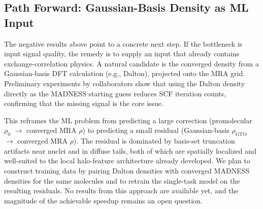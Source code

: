 \subsection{Path Forward: Gaussian-Basis Density as ML Input}
\label{sec:path_forward}

The negative results above point to a concrete next step. If the
bottleneck is input signal quality, the remedy is to supply an input
that already contains exchange-correlation physics. A natural candidate
is the converged density from a Gaussian-basis DFT calculation (e.g.,
Dalton), projected onto the MRA grid. Preliminary experiments by
collaborators show that using the Dalton density directly as the
MADNESS starting guess reduces SCF iteration counts, confirming that
the missing signal is the core issue.

This reframes the ML problem from predicting a large correction
(promolecular $\rho_0$ $\to$ converged MRA $\rho$) to predicting a
small residual (Gaussian-basis $\rho_{\text{GTO}}$ $\to$ converged MRA
$\rho$). The residual is dominated by basis-set truncation artifacts
near nuclei and in diffuse tails, both of which are spatially localized
and well-suited to the local halo-feature architecture already
developed. We plan to construct training data by pairing Dalton
densities with converged MADNESS densities for the same molecules and
to retrain the single-task model on the resulting residuals. No
results from this approach are available yet, and the magnitude of the
achievable speedup remains an open question.
